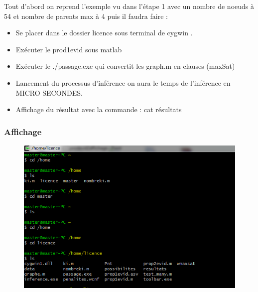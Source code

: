 \documentclass[12pt,a4paper,oneside]{book}
\begin{document}
      Tout d'abord on reprend l'exemple vu dans l'étape 1 avec un nombre de noeuds à 54 et nombre de parents max à 4 puis il faudra faire :
      \begin{itemize}
      	\item Se placer dans le dossier licence sous terminal de cygwin .
      	\item Exécuter le prod1evid sous matlab
      	\item Exécuter le ./passage.exe qui convertit les graph.m en clauses (maxSat)
      	\item Lancement du processus d'inférence on aura le temps de l'inférence en MICRO SECONDES.
      	\item Affichage du résultat avec la commande : cat résultats
      \end{itemize}
      
      \subsubsection{Affichage}
      
      
      
      	
      		\begin{figure}[H]
      				\centering
      			\includegraphics[scale=1]{screens/etape2terminal.png}%
      			\label{labelname}%
      		\end{figure}
      		
\end{document}
